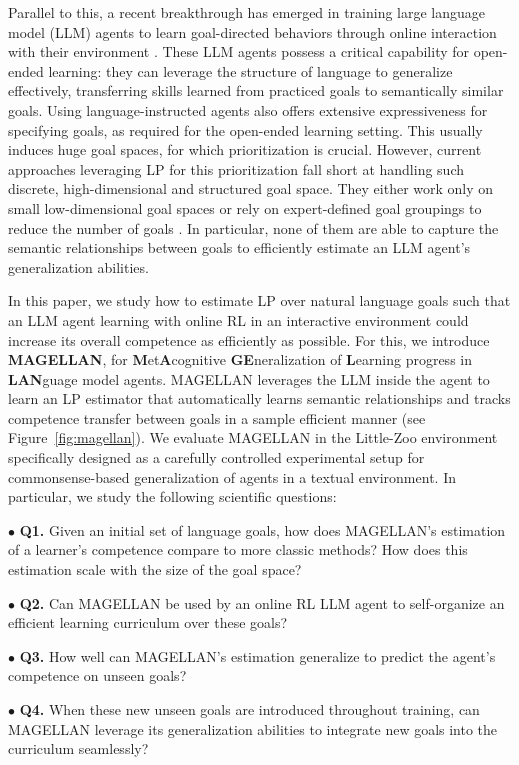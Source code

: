Parallel to this, a recent breakthrough has emerged in training large language model (LLM) agents to learn goal-directed behaviors through online interaction with their environment \cite{carta_grounding_2023,wen_entropy-regularized_2024,wen_reinforcing_2024}. These LLM agents possess a critical capability for open-ended learning: they can leverage the structure of language to generalize effectively, transferring skills learned from practiced goals to semantically similar goals. %
Using language-instructed agents also offers extensive expressiveness for specifying goals, as required for the open-ended learning setting. This usually induces huge goal spaces, for which prioritization is crucial. %
However, current approaches leveraging %
LP for this prioritization fall short at handling such discrete, high-dimensional and structured goal space. %
They either work only on small low-dimensional goal spaces \cite{baranes_active_2013,portelas_teacher_2019,kanitscheider_multi-task_2021,zhang_omni_2024} or rely on expert-defined goal groupings to reduce the number of goals \cite{colas_curious_2019,akakzia_grounding_2021,kumar_practice_2024}. In particular, none of them are able to capture the semantic relationships between goals to efficiently estimate an LLM agent's generalization abilities.

In this paper, we study how to estimate LP over natural language goals such that an LLM agent learning with online RL in an interactive environment could increase its overall competence as efficiently as possible. For this, we introduce \textbf{MAGELLAN}, for \textbf{M}et\textbf{A}cognitive \textbf{GE}neralization of \textbf{L}earning progress in \textbf{LAN}guage model agents. MAGELLAN leverages the LLM inside the agent to learn an LP estimator that automatically learns semantic relationships and tracks competence transfer between goals in a sample efficient manner (see Figure~\ref{fig:magellan}). We evaluate MAGELLAN in the Little-Zoo environment specifically designed as a carefully controlled experimental setup for commonsense-based generalization of agents in a textual environment. In particular, we study the following scientific questions:

\par\smallskip $\bullet$
\textbf{Q1.} Given an initial set of language goals, how does MAGELLAN's estimation of a learner's competence compare to more classic methods? How does this estimation scale with the size of the goal space?
\par\smallskip $\bullet$
\textbf{Q2.} Can MAGELLAN be used by an online RL LLM agent to self-organize an efficient learning curriculum over these goals?
\par\smallskip $\bullet$
\textbf{Q3.} How well can MAGELLAN's estimation generalize to predict the agent’s competence on unseen goals?
\par\smallskip $\bullet$
\textbf{Q4.} When these new unseen goals are introduced throughout training, can MAGELLAN leverage its generalization abilities to integrate new goals into the curriculum seamlessly?


